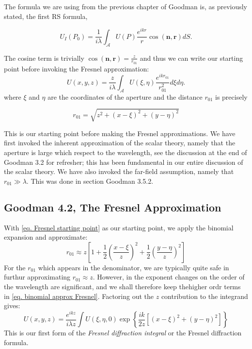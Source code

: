 \documentclass[../../main.tex]{subfiles}
\begin{document}
The formula we are using from the previous chapter of Goodman is, as previously stated, the first RS formula, 

\begin{equation}\label{eq. Sommerfeld solution 1 far field again}
    U_I(P_0)=\frac{1}{i\lambda}\int_{\mathcal{A}}U(P)\frac{e^{ikr}}{r}\cos(\mathbf{n},\mathbf{r})dS.
\end{equation}

The cosine term is trivially $\cos(\mathbf{n},\mathbf{r})=\frac{z}{r_{01}}$ and thus we can write our starting point before invoking the Fresnel approximation:
\begin{equation}\label{eq. Fresnel starting point}
    U(x,y,z)=\frac{z}{i\lambda}\int_{\mathcal{A}}U(\xi,\eta)\frac{e^{ikr_{01}}}{r_{01}^2}d\xi d\eta.
\end{equation}
where $\xi$ and $\eta$ are the coordinates of the aperture and the distance $r_{01}$ is precisely 

\begin{equation}\label{eq. r01 exact}
r_{01}=\sqrt{z^2+(x-\xi)^2+(y-\eta)^2}
\end{equation}

This is our starting point before making the Fresnel approximations. We have first invoked the inherent approximation of the scalar theory, namely that the aperture is large which respect to the wavelength, see the discussion at the end of Goodman 3.2 for refresher; this has been fundamental in our entire discussion of the scalar theory. We have also invoked the far-field assumption, namely that $r_{01}\gg \lambda$. This was done in section Goodman 3.5.2. 

\subsection{Goodman 4.2, The Fresnel Approximation}
With \cref{eq. Fresnel starting point} as our starting point, we apply the binomial expansion and approximate:
\begin{equation}\label{eq. binomial approx Fresnel}
    r_{01}\approx z\left[1+\frac12 \left(\frac{x-\xi}{z}\right)^2+\frac12 \left(\frac{y-\eta}{z}\right)^2\right]
\end{equation}
For the $r_{01}$ which appears in the denominator, we are typically quite safe in furthur approximating $r_01\approx z$. However, in the exponent changes on the order of the wavelength are significant, and we shall therefore keep thehigher ordr terms in \cref{eq. binomial approx Fresnel}. Factoring out the $z$ contribution to the integrand gives:
\begin{equation}\label{eq. Fresnel main diffraction formula 1}
    U(x,y,z)=\frac{e^{ikz}}{i\lambda z}\int U(\xi,\eta,0)\exp{\left\{ \frac{ik}{2z}\left[(x-\xi)^2+(y-\eta)^2\right]\right\}}
\end{equation}
This is our first form of the \textit{Fresnel diffraction integral} or the Fresnel diffraction formula. 
\end{document}
